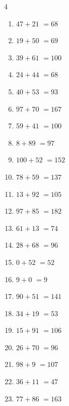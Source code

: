 \begin{multicols}{4}
\begin{enumerate}
  \item $47+21$
        $=68$

  \item $19+50$
        $=69$

  \item $39+61$
        $=100$

  \item $24+44$
        $=68$

  \item $40+53$
        $=93$

\columnbreak %

  \item $97+70$
        $=167$

  \item $59+41$
        $=100$

  \item $8+89$
        $=97$

  \item $100+52$
        $=152$

  \item $78+59$
        $=137$

  \item $13+92$
        $=105$

  \item $97+85$
        $=182$

  \item $61+13$
        $=74$

  \item $28+68$
        $=96$

  \item $0+52$
        $=52$

  \item $9+0$
        $=9$

  \item $90+51$
        $=141$

  \item $34+19$
        $=53$

  \item $15+91$
        $=106$

  \item $26+70$
        $=96$

  \item $98+9$
        $=107$

  \item $36+11$
        $=47$

  \item $77+86$
        $=163$


\end{enumerate}
\end{multicols}
